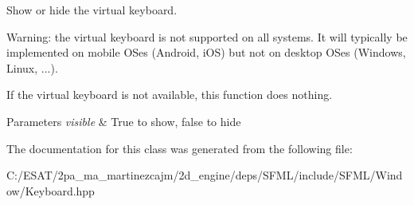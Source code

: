 Show or hide the virtual keyboard. 

Warning\+: the virtual keyboard is not supported on all systems. It will typically be implemented on mobile O\+Ses (Android, i\+OS) but not on desktop O\+Ses (Windows, Linux, ...).

If the virtual keyboard is not available, this function does nothing.


\begin{DoxyParams}{Parameters}
{\em visible} & True to show, false to hide \\
\hline
\end{DoxyParams}


The documentation for this class was generated from the following file\+:\begin{DoxyCompactItemize}
\item 
C\+:/\+E\+S\+A\+T/2pa\+\_\+ma\+\_\+martinezcajm/2d\+\_\+engine/deps/\+S\+F\+M\+L/include/\+S\+F\+M\+L/\+Window/Keyboard.\+hpp\end{DoxyCompactItemize}
